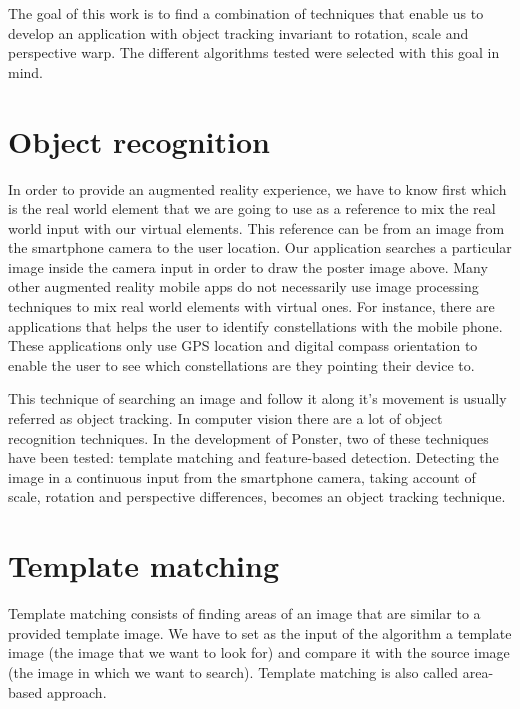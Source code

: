 The goal of this work is to find a combination of techniques that enable us to
develop an application with object tracking invariant to rotation, scale and
perspective warp. The different algorithms tested were selected with this goal
in mind. 



\section{Object recognition}
In order to provide an augmented reality experience, we have to know first
which is the real world element that we are going to use as a reference to mix
the real world input with our virtual elements. This reference can be from an
image from the smartphone camera to the user location. Our application searches a
particular image inside the camera input in order to draw the poster image
above. Many other augmented reality mobile apps do not necessarily use image
processing techniques to mix real world elements with virtual ones. For
instance, there are applications that helps the user to identify constellations
with the mobile phone. These applications only use GPS location and digital
compass orientation to enable the user to see which constellations are they
pointing their device to.

This technique of searching an image and follow it along it's 
movement is usually referred as object tracking. 
In computer vision there are a lot of object recognition techniques. In the
development of Ponster, two of these techniques have been tested: template
matching and feature-based detection. Detecting the image in a continuous input from
the smartphone camera, taking account of scale, rotation and perspective
differences, becomes an object tracking technique. 

\section{Template matching}
Template matching\cite{ocv01} consists of finding areas of an image that are similar to a
provided template image. We have to set as the input of the algorithm a template image (the image that we want
to look for) and compare it with the source image (the image in which we want to
search)\cite{tmatch01}. Template matching is also called area-based approach.

